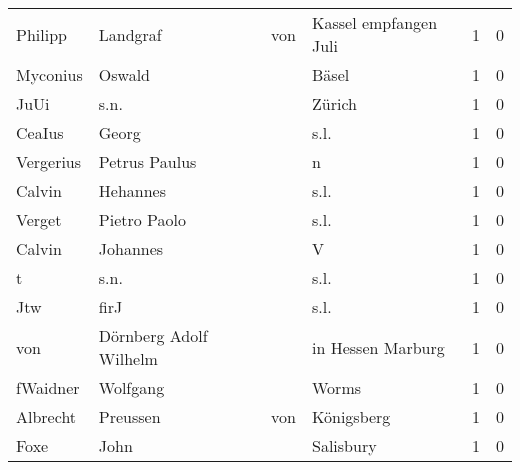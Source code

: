 \documentclass[10pt,a4paper,landscape]{article}
\begin{document}
\begin{longtable}{llllrr}
                  Philipp &                           Landgraf &         von &                       Kassel empfangen Juli &          1 &         0 \\
                 Myconius &                             Oswald &             &                                       Bäsel &          1 &         0 \\
                     JuUi &                               s.n. &             &                                      Zürich &          1 &         0 \\
                   CeaIus &                              Georg &             &                                        s.l. &          1 &         0 \\
                Vergerius &                      Petrus Paulus &             &                                           n &          1 &         0 \\
                   Calvin &                           Hehannes &             &                                        s.l. &          1 &         0 \\
                   Verget &                       Pietro Paolo &             &                                        s.l. &          1 &         0 \\
                   Calvin &                           Johannes &             &                                           V &          1 &         0 \\
                        t &                               s.n. &             &                                        s.l. &          1 &         0 \\
                      Jtw &                               firJ &             &                                        s.l. &          1 &         0 \\
                      von &             Dörnberg Adolf Wilhelm &             &                           in Hessen Marburg &          1 &         0 \\
                 fWaidner &                           Wolfgang &             &                                       Worms &          1 &         0 \\
                 Albrecht &                           Preussen &         von &                                  Königsberg &          1 &         0 \\
                     Foxe &                               John &             &                                   Salisbury &          1 &         0 \\

\end{longtable}
\end{document}
